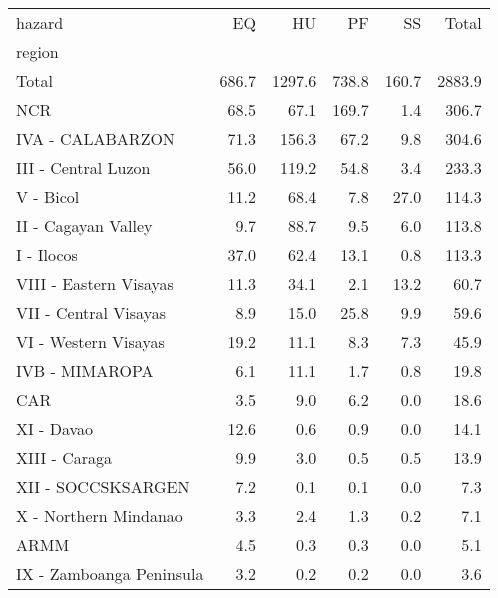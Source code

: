 \begin{tabular}{lrrrrr}
\toprule
hazard &     EQ &      HU &     PF &     SS &   Total \\
region                   &        &         &        &        &         \\
\midrule
Total                    &  686.7 &  1297.6 &  738.8 &  160.7 &  2883.9 \\
NCR                      &   68.5 &    67.1 &  169.7 &    1.4 &   306.7 \\
IVA - CALABARZON         &   71.3 &   156.3 &   67.2 &    9.8 &   304.6 \\
III - Central Luzon      &   56.0 &   119.2 &   54.8 &    3.4 &   233.3 \\
V - Bicol                &   11.2 &    68.4 &    7.8 &   27.0 &   114.3 \\
II - Cagayan Valley      &    9.7 &    88.7 &    9.5 &    6.0 &   113.8 \\
I - Ilocos               &   37.0 &    62.4 &   13.1 &    0.8 &   113.3 \\
VIII - Eastern Visayas   &   11.3 &    34.1 &    2.1 &   13.2 &    60.7 \\
VII - Central Visayas    &    8.9 &    15.0 &   25.8 &    9.9 &    59.6 \\
VI - Western Visayas     &   19.2 &    11.1 &    8.3 &    7.3 &    45.9 \\
IVB - MIMAROPA           &    6.1 &    11.1 &    1.7 &    0.8 &    19.8 \\
CAR                      &    3.5 &     9.0 &    6.2 &    0.0 &    18.6 \\
XI - Davao               &   12.6 &     0.6 &    0.9 &    0.0 &    14.1 \\
XIII - Caraga            &    9.9 &     3.0 &    0.5 &    0.5 &    13.9 \\
XII - SOCCSKSARGEN       &    7.2 &     0.1 &    0.1 &    0.0 &     7.3 \\
X - Northern Mindanao    &    3.3 &     2.4 &    1.3 &    0.2 &     7.1 \\
ARMM                     &    4.5 &     0.3 &    0.3 &    0.0 &     5.1 \\
IX - Zamboanga Peninsula &    3.2 &     0.2 &    0.2 &    0.0 &     3.6 \\
\bottomrule
\end{tabular}
